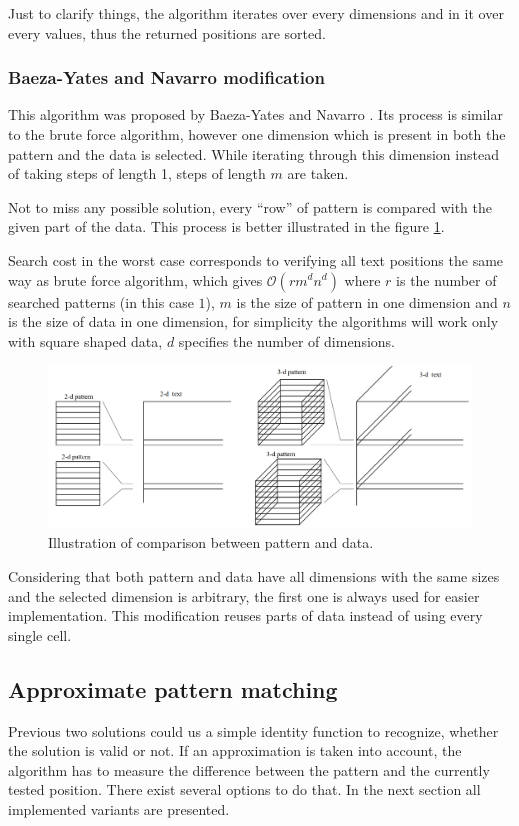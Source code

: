 Just to clarify things, the algorithm iterates over every dimensions and in it over every values, thus the returned positions are sorted.

\subsubsection{Baeza-Yates and Navarro modification}\label{bynepm}
This algorithm was proposed by Baeza-Yates and Navarro \cite{mdApproxPM}. Its process is similar to the brute force algorithm, however one dimension which is present in both the pattern and the data is selected. While iterating through this dimension instead of taking steps of length 1, steps of length $m$ are taken.

Not to miss any possible solution, every ``row'' of pattern is compared with the given part of the data. This process is better illustrated in the figure \ref{fig_skipDim}.

Search cost in the worst case corresponds to verifying all text positions the same way as brute force algorithm, which gives $ \mathcal{O} (rm^dn^d)$ where $r$ is the number of searched patterns (in this case $1$), $m$ is the size of pattern in one dimension and $n$ is the size of data in one dimension, for simplicity the algorithms will work only with square shaped data, $d$ specifies the number of dimensions. \cite{mdApproxPM}

\begin{figure}
\centering
\includegraphics[width=\textwidth]{skipDim}
\caption{Illustration of comparison between pattern and data. \cite{mdApproxPM}}
\label{fig_skipDim}
\end{figure}

Considering that both pattern and data have all dimensions with the same sizes and the selected dimension is arbitrary, the first one is always used for easier implementation. This modification reuses parts of data instead of using every single cell.

\subsection{Approximate pattern matching} \label{apm}
Previous two solutions could us a simple identity function to recognize, whether the solution is valid or not. If an approximation is taken into account, the algorithm has to measure the difference between the pattern and the currently tested position. There exist several options to do that. In the next section all implemented variants are presented.

